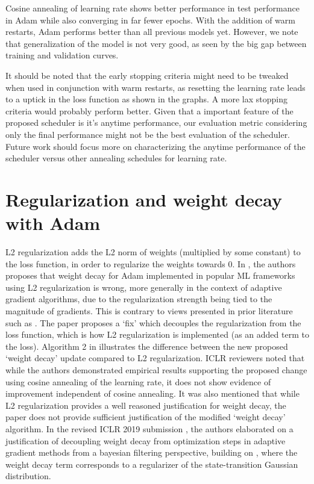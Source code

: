 \documentclass{article}
\begin{document}
Cosine annealing of learning rate shows better performance in test performance in Adam while also converging in far fewer epochs. With the addition of warm restarts, Adam performs better than all previous models yet. However, we note that generalization of the model is not very good, as seen by the big gap between training and validation curves.

It should be noted that the early stopping criteria might need to be tweaked when used in conjunction with warm restarts, as resetting the learning rate leads to a uptick in the loss function as shown in the graphs. A more lax stopping criteria would probably perform better. Given that a important feature of the proposed scheduler is it's anytime performance, our evaluation metric considering only the final performance might not be the best evaluation of the scheduler. Future work should focus more on characterizing the anytime performance of the scheduler versus other annealing schedules for learning rate.


\section{Regularization and weight decay with Adam}
L2 regularization adds the L2 norm of weights (multiplied by some constant) to the loss function, in order to regularize the weights towards 0. In \citet{loshchilov2018fixing}, the authors proposes that weight decay for Adam implemented in popular ML frameworks using L2 regularization is wrong, more generally in the context of adaptive gradient algorithms, due to the regularization strength being tied to the magnitude of gradients. This is contrary to views presented in prior literature such as \citet{Goodfellow-et-al-2016}. The paper proposes a `fix' which decouples the regularization from the loss function, which is how L2 regularization is implemented (as an added term to the loss). Algorithm 2 in \citet{loshchilov2018fixing} illustrates the difference between the new proposed `weight decay' update compared to L2 regularization. ICLR reviewers noted that while the authors demonstrated empirical results supporting the proposed change using cosine annealing of the learning rate, it does not show evidence of improvement independent of cosine annealing. It was also mentioned that while L2 regularization provides a well reasoned justification for weight decay, the paper does not provide sufficient justification of the modified `weight decay' algorithm. In the revised ICLR 2019 submission \cite{anonymous2019decoupled}, the authors elaborated on a justification of decoupling weight decay from optimization steps in adaptive gradient methods from a bayesian filtering perspective, building on \citet{aitchison2018unified}, where the weight decay term corresponds to a regularizer of the state-transition Gaussian distribution. 
\end{document}
